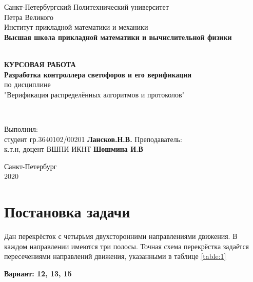 \documentclass[a4papaer,12pt]{article}
\renewcommand{\listoffigures}{\begingroup  %
\tocsection
\tocfile{\listfigurename}{lof}
\endgroup}
\renewcommand{\listoftables}{\begingroup  %
\tocsection
\tocfile{\listtablename}{lot}
\endgroup}
\begin{document}
\begin{titlepage}
	\center
		Санкт-Петербургский Политехнический
		университет \\ Петра Великого\\
		Институт прикладной математики и механики
		\\ \textbf{Высшая школа прикладной математики и вычислительной физики}

	\vfill ~
	\textbf{
		\\ \large КУРСОВАЯ РАБОТА \\
        Разработка контроллера светофоров и его верификация
	}
	\\ по дисциплине
	\\ "Верификация распределённых алгоритмов и протоколов"

	\vfill ~

    \begin{flushleft}
    Выполнил: \\ студент гр.3640102/00201  \hspace{\fill} \textbf{Лансков.Н.В.} \linebreak[4]
    Преподаватель: \\ к.т.н, доцент ВШПИ ИКНТ \hspace{\fill} \textbf{Шошмина И.В} \\
    \end{flushleft}

\vfill

{\large}	Санкт-Петербург
\\ 2020
\end{titlepage}

\tableofcontents 
\listoffigures
\listoftables
\newpage

\section{Постановка задачи}

Дан перекрёсток с четырьмя двухсторонними направлениями движения. В каждом направлении имеются
три полосы. Точная схема перекрёстка задаётся пересечениями направлений движения, указанными 
в таблице \ref{table:1}

\textbf{Вариант: 12, 13, 15}
\end{document}
